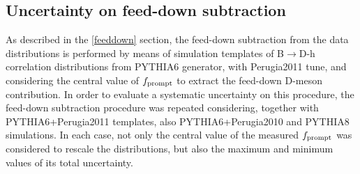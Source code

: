 \subsection{Uncertainty on feed-down subtraction}
As described in the \ref{feeddown} section, the feed-down subtraction from the data distributions is performed by means of simulation templates of B$\rightarrow$D-h correlation distributions from PYTHIA6 generator, with Perugia2011 tune, and considering the central value of $f_{\rm prompt}$ to extract the feed-down D-meson contribution. In order to evaluate a systematic uncertainty on this procedure, the feed-down subtraction procedure was repeated considering, together with PYTHIA6+Perugia2011 templates, also PYTHIA6+Perugia2010 and PYTHIA8 simulations. In each case, not only the central value of the measured $f_{\rm prompt}$ was considered to rescale the distributions, but also the maximum and minimum values of its total uncertainty.

